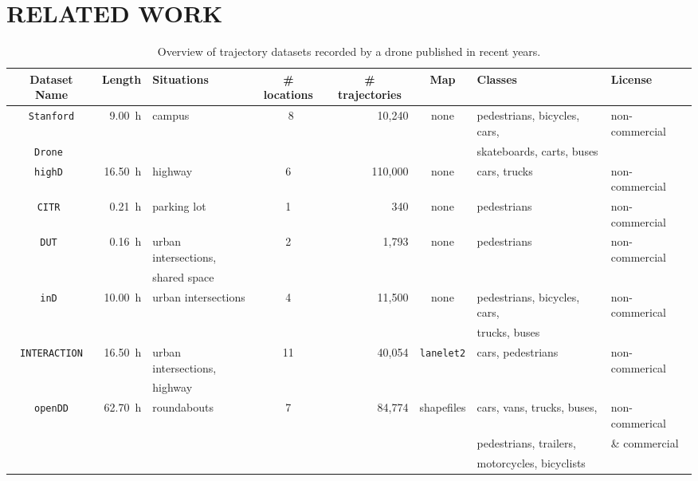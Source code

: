 \documentclass[a4paper, 10pt, conference]{ieeeconf}      %
\begin{document}
\section{RELATED WORK} \label{sec:relatedWork}
\begin{table}[h!]
  \caption{Overview of trajectory datasets recorded by a drone published in recent years.} \label{tab:relatedWork_datasets}
  \begin{center}
    \begin{tabular}{c|r|l|c|r|c|l|l}
      \multicolumn{1}{c|}{Dataset Name} & \multicolumn{1}{c|}{Length} & Situations & \multicolumn{1}{c|}{\# locations} &\multicolumn{1}{c|}{\# trajectories} & \multicolumn{1}{c|}{Map} & Classes & License \\
      \hline
      \hline
      \texttt{Stanford} & \SI{9,00}{\hour} & campus & \SI{}{8} & 10,240 & none & pedestrians, bicycles, cars, & non-commercial \\
       \texttt{\quad Drone}~\cite{robicquet_learning_2016}              & &        &   &        &      & skateboards, carts, buses & \\
      \hline
    \texttt{highD}~\cite{krajewski_highd_2018} & \SI{16,50}{\hour} & highway & 6 & 110,000 & none & cars, trucks & non-commercial \\
      \hline
      \texttt{CITR}~\cite{yang_top-view_2019} & \SI{0,21}{\hour} & parking lot & 1 & 340 & none & pedestrians & non-commercial \\
      \hline
      \texttt{DUT}~\cite{yang_top-view_2019} & \SI{0,16}{\hour} & urban intersections, & 2 & 1,793 & none & pedestrians & non-commercial \\
      & & shared space & & & & & \\
      \hline
    \texttt{inD}~\cite{bock_ind_2019} & \SI{10,00}{\hour} & urban intersections & 4 & 11,500 &  none & pedestrians, bicycles, cars, & non-commerical \\
                                 &     &                     &   &       & & trucks, buses               &\\
      \hline
      \texttt{INTERACTION} & \SI{16,50}{\hour} & urban intersections, & 11 & 40,054 & \texttt{lanelet2} & cars, pedestrians  & non-commerical \\
      \cite{wei_interaction_2019} & & highway & & & \cite{poggenhans_lanelet2:_2018} & & \\
      \hline
      \texttt{openDD} & \SI{62,70}{\hour}& roundabouts & 7 & 84,774 & shapefiles & cars, vans, trucks, buses, & non-commerical \\
             &     &                     &   &     &                                           & pedestrians, trailers,& \& commercial \\
             &     &                     &   &     &                                           & motorcycles, bicyclists & \\
    \end{tabular}
  \end{center} \end{table}
\end{document}
